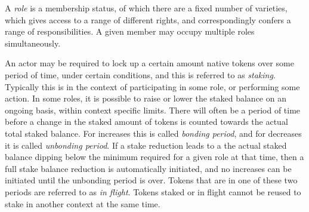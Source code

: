 \documentclass{article}
\begin{document}
A \textit{role} is a membership status, of which there are a fixed number of varieties, which gives access to a range of different rights, and correspondingly confers a range of responsibilities. A given member may occupy multiple roles simultaneously.

\begin{comment}
\renewcommand{\arraystretch}{2.1} %
\begin{table}[!t]
\begin{center}
\resizebox{0.8\textwidth}{!}{\begin{minipage}{\textwidth}
\begin{tabular}{lp{5cm}p{2cm}cp{3cm}}

 \toprule

 \bf Name &
 \bf Description &
 \bf Reward &
 \bf Staked &
 \bf Entry \\

 \midrule

 Validator &
 Participates in the consensus algorithm as a block producer and validator. Read more in section X. &
 0 &
 Yes &
 004\\

 Member &
 Participates in the consensus algorithm as a block producer and validator. Read more in section X. &
 0 &
 Yes &
 004\\

 Voter &
 Participates in the consensus algorithm as a block producer and validator. Read more in section X. &
 0 &
 Yes &
 004\\

 Counicil Member &
 Participates in the consensus algorithm as a block producer and validator. Read more in section X. &
 0 &
 Yes &
 004\\

\bottomrule
\end{tabular}
\caption{Table of all roles on the platform.}
\label{tbl:role_list}
\end{minipage} }
\end{center}
\end{table}
\end{comment}

An actor may be required to lock up a certain amount native tokens over some period of time, under certain conditions, and this is referred to as
\textit{staking}. Typically this is in the context of participating in some role, or performing some action. In some roles, it is possible to raise or lower the staked balance on an ongoing basis, within context specific limits. There will often be a period of time before a change in the staked amount of tokens is counted towards the actual total staked balance. For increases this is called \textit{bonding period}, and for decreases it is called \textit{unbonding period}. If a stake reduction leads to a the actual staked balance dipping below the minimum required for a given role at that time, then a full stake balance reduction is automatically initiated, and no increases can be initiated until the unbonding period is over. Tokens that are in one of these two periods are referred to as \textit{in flight}. Tokens staked or in flight cannot be reused to stake in another context at the same time.
\end{document}
